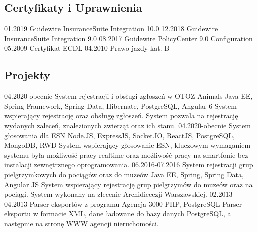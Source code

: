 \documentclass[]{friggeri-cv} %
\begin{document}
	\begin{absolutelynopagebreak}
		\section{Certyfikaty i Uprawnienia}
		\begin{entrylist}
			\cert
			{01.2019}
			{Guidewire InsuranceSuite Integration 10.0}
			\cert
			{12.2018}
			{Guidewire InsuranceSuite Integration 9.0}
			\cert
			{08.2017}
			{Guidewire PolicyCenter 9.0 Configuration}
			\cert
			{05.2009}
			{Certyfikat ECDL}
			\cert
			{04.2010}
			{Prawo jazdy kat. B}
		\end{entrylist}
	\end{absolutelynopagebreak}
	
	\begin{absolutelynopagebreak}
		\section{Projekty}
		\begin{entrylist}
			\entry
			{04.2020-obecnie}
			{System rejestracji i obsługi zgłoszeń w OTOZ Animals}
			{Java EE, Spring Framework, Spring Data, Hibernate, PostgreSQL, Angular 6}
			{System wspierający rejestrację oraz obsługę zgłoszeń. System pozwala na rejestrację wydanych zaleceń, znalezionych zwierząt oraz ich stanu.}
			\entry
			{04.2020-obecnie}
			{System głosowania dla ESN}
			{Node.JS, ExpressJS, Socket.IO, ReactJS, PostgreSQL, MongoDB, RWD}
			{System wspierający głosowanie ESN, kluczowym wymaganiem systemu była możliwość pracy realtime oraz możliwość pracy na smartfonie bez instalacji zewnętrznego oprogramowania.}
			\entry
			{06.2016-07.2016}
			{System rejestracji grup pielgrzymkowych do pociągów oraz do muzeów}
			{Java EE, Spring, Spring Data, Angular JS}
			{System wspierający rejestrację grup pielgrzymów do muzeów oraz na pociągi. System wykonany na zlecenie Archidiecezji Warszawskiej.}
			\entry
			{02.2013-04.2013}
			{Parser eksportów z programu Agencja 3000}
			{PHP, PostgreSQL}
			{Parser eksportu w formacie XML, dane ładowane do bazy danych PostgreSQL, a następnie na stronę WWW agencji nieruchomości.}
		\end{entrylist}
	\end{absolutelynopagebreak}
	
\end{document}
